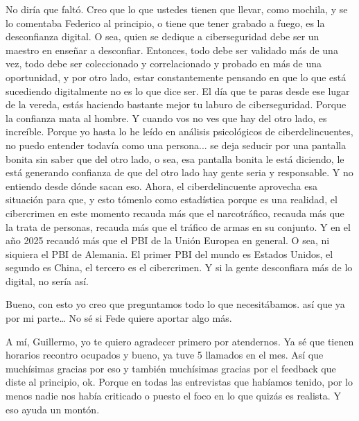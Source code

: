 \begin{description}[leftmargin=0cm, labelsep=0.5cm]
    \item[\textbf{PITA GUILLERMO:}] No diría que faltó. Creo que lo que ustedes tienen que llevar, como mochila, y se lo comentaba Federico al principio, o tiene que tener grabado a fuego, es la desconfianza digital. O sea, quien se dedique a ciberseguridad debe ser un maestro en enseñar a desconfiar. Entonces, todo debe ser validado más de una vez, todo debe ser coleccionado y correlacionado y probado en más de una oportunidad, y por otro lado, estar constantemente pensando en que lo que está sucediendo digitalmente no es lo que dice ser. El día que te paras desde ese lugar de la vereda, estás haciendo bastante mejor tu laburo de ciberseguridad. Porque la confianza mata al hombre. Y cuando vos no ves que hay del otro lado, es increíble. Porque yo hasta lo he leído en análisis psicológicos de ciberdelincuentes, no puedo entender todavía como una persona... se deja seducir por una pantalla bonita sin saber que del otro lado, o sea, esa pantalla bonita le está diciendo, le está generando confianza de que del otro lado hay gente seria y responsable. Y no entiendo desde dónde sacan eso. Ahora, el ciberdelincuente aprovecha esa situación para que, y esto tómenlo como estadística porque es una realidad, el cibercrimen en este momento recauda más que el narcotráfico, recauda más que la trata de personas, recauda más que el tráfico de armas en su conjunto. Y en el año 2025 recaudó más que el PBI de la Unión Europea en general. O sea, ni siquiera el PBI de Alemania. El primer PBI del mundo es Estados Unidos, el segundo es China, el tercero es el cibercrimen. Y si la gente desconfiara más de lo digital, no sería así.

    \item[\textbf{MOCIULSKY SANTIAGO:}] Bueno, con esto yo creo que preguntamos todo lo que necesitábamos. así que ya por mi parte… No sé si Fede quiere aportar algo más.

    \item[\textbf{MUNTAABSKI FEDERICO:}] A mí, Guillermo, yo te quiero agradecer primero por atendernos. Ya sé que tienen horarios recontro ocupados y bueno, ya tuve 5 llamados en el mes. Así que muchísimas gracias por eso y también muchísimas gracias por el feedback que diste al principio, ok. Porque en todas las entrevistas que habíamos tenido, por lo menos nadie nos había criticado o puesto el foco en lo que quizás es realista. Y eso ayuda un montón.


\end{description}

